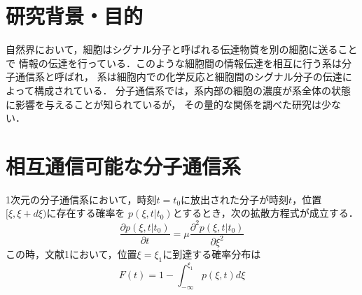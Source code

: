 \documentclass[twocolumn]{jarticle}
\begin{document}
\maketitle

\section{研究背景・目的}
自然界において，細胞はシグナル分子と呼ばれる伝達物質を別の細胞に送ることで
情報の伝達を行っている．このような細胞間の情報伝達を相互に行う系は分子通信系と呼ばれ，
系は細胞内での化学反応と細胞間のシグナル分子の伝達によって構成されている．
分子通信系では，系内部の細胞の濃度が系全体の状態に影響を与えることが知られているが，
その量的な関係を調べた研究は少ない．


\section{相互通信可能な分子通信系}
1次元の分子通信系において，時刻$t=t_0$に放出された分子が時刻$t$，位置$[\xi,\xi+d\xi)$に存在する確率を
$p(\xi,t|t_0)$とするとき，次の拡散方程式が成立する．
\begin{equation}
    \frac{\partial p(\xi,t|t_0)}{\partial t} = \mu \frac{\partial^2p(\xi,t|t_0)}{\partial\xi^2}
\end{equation}
この時，文献1において，位置$\xi =\xi_1$に到達する確率分布は
\begin{equation}
    F(t) = 1- \int_{-\infty}^{\xi_1} p(\xi,t)d\xi
\end{equation}
\end{document}
